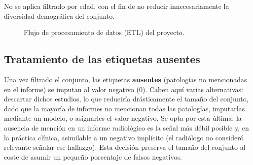 No se aplica filtrado por edad, con el fin de no reducir innecesariamente la
diversidad demográfica del conjunto.

\begin{figure}[ht]
\centering
{}
\caption{Flujo de procesamiento de datos (ETL) del proyecto.}
\label{fig::mm_pipeline_etl}
\end{figure}

\subsection{Tratamiento de las etiquetas ausentes}

Una vez filtrado el conjunto, las etiquetas \textbf{ausentes} (patologías no
mencionadas en el informe) se imputan al valor negativo (0). Caben aquí varias
alternativas: descartar dichos estudios, lo que reduciría drásticamente el
tamaño del conjunto, dado que la mayoría de informes no mencionan todas las
patologías, imputarlas mediante un modelo, o asignarles el valor negativo. Se
opta por esta última: la ausencia de mención en un informe radiológico es la
señal más débil posible y, en la práctica clínica, asimilable a un negativo
implícito (el radiólogo no consideró relevante señalar ese hallazgo). Esta
decisión preserva el tamaño del conjunto al coste de asumir un pequeño porcentaje
de falsos negativos.

